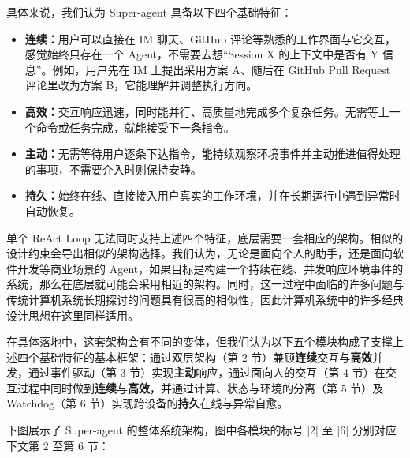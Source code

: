 \documentclass[11pt,a4paper,UTF8,fontset=windows]{ctexart}
\begin{document}
具体来说，我们认为 Super-agent 具备以下四个基础特征：

\begin{itemize}
  \item \textbf{连续：}用户可以直接在 IM 聊天、GitHub 评论等熟悉的工作界面与它交互，感觉始终只存在一个 Agent，不需要去想“Session X 的上下文中是否有 Y 信息”。例如，用户先在 IM 上提出采用方案 A、随后在 GitHub Pull Request 评论里改为方案 B，它能理解并调整执行方向。
  \item \textbf{高效：}交互响应迅速，同时能并行、高质量地完成多个复杂任务。无需等上一个命令或任务完成，就能接受下一条指令。
  \item \textbf{主动：}无需等待用户逐条下达指令，能持续观察环境事件并主动推进值得处理的事项，不需要介入时则保持安静。
  \item \textbf{持久：}始终在线、直接接入用户真实的工作环境，并在长期运行中遇到异常时自动恢复。
\end{itemize}

单个 ReAct Loop 无法同时支持上述四个特征，底层需要一套相应的架构。相似的设计约束会导出相似的架构选择。我们认为，无论是面向个人的助手，还是面向软件开发等商业场景的 Agent，如果目标是构建一个持续在线、并发响应环境事件的系统，那么在底层就可能会采用相近的架构。同时，这一过程中面临的许多问题与传统计算机系统长期探讨的问题具有很高的相似性，因此计算机系统中的许多经典设计思想在这里同样适用。

在具体落地中，这套架构会有不同的变体，但我们认为以下五个模块构成了支撑上述四个基础特征的基本框架：通过双层架构（第 2 节）兼顾\textbf{连续}交互与\textbf{高效}并发，通过事件驱动（第 3 节）实现\textbf{主动}响应，通过面向人的交互（第 4 节）在交互过程中同时做到\textbf{连续}与\textbf{高效}，并通过计算、状态与环境的分离（第 5 节）及 Watchdog（第 6 节）实现跨设备的\textbf{持久}在线与异常自愈。

下图展示了 Super-agent 的整体系统架构，图中各模块的标号 [2] 至 [6] 分别对应下文第 2 至第 6 节：
\end{document}
